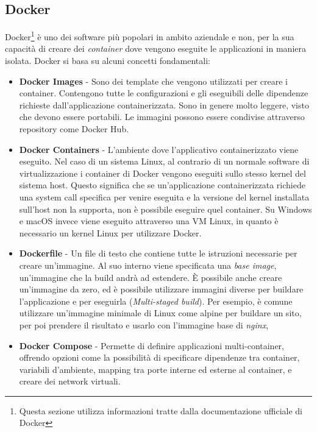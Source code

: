 \subsection{Docker}
Docker\footnote{Questa sezione utilizza informazioni tratte dalla documentazione ufficiale di Docker\cite{dockerdocs}}
\`e uno dei software pi\`u popolari in ambito aziendale e non, per la sua capacit\`a di creare dei \textit{container} dove vengono eseguite le applicazioni in maniera isolata.
Docker si basa su alcuni concetti fondamentali:
\begin{itemize}
  \item \textbf{Docker Images} - Sono dei template che vengono utilizzati per creare i container. Contengono tutte le configurazioni e gli eseguibili delle dipendenze richieste
    dall'applicazione containerizzata. Sono in genere molto leggere, visto che devono essere portabili. Le immagini possono essere condivise attraverso repository come Docker Hub.
  \item \textbf{Docker Containers} - L'ambiente dove l'applicativo containerizzato viene eseguito. Nel caso di un sistema Linux, al contrario di un normale software di virtualizzazione
    i container di Docker vengono eseguiti sullo stesso kernel del sistema host. Questo significa che se un'applicazione containerizzata richiede una system call specifica
    per venire eseguita e la versione del kernel installata sull'host non la supporta, non \`e possibile eseguire quel container. Su Windows e macOS invece viene eseguito
    attraverso una VM Linux, in quanto \`e necessario un kernel Linux per utilizzare Docker.
  \item \textbf{Dockerfile} - Un file di testo che contiene tutte le istruzioni necessarie per creare un'immagine. Al suo interno viene specificata una \textit{base image},
    un'immagine che la build andr\`a ad estendere. \`E possibile anche creare un'immagine da zero, ed \`e possibile utilizzare immagini diverse per buildare l'applicazione e per eseguirla
    (\textit{Multi-staged build}). Per esempio, \`e comune utilizzare un'immagine minimale di Linux come alpine per buildare un sito, per poi prendere il risultato e usarlo con
    l'immagine base di \textit{nginx},
  \item \textbf{Docker Compose} - Permette di definire applicazioni multi-container, offrendo opzioni come la possibilit\`a di specificare dipendenze tra container, variabili d'ambiente,
    mapping tra porte interne ed esterne al container, e creare dei network virtuali.
\end{itemize}

